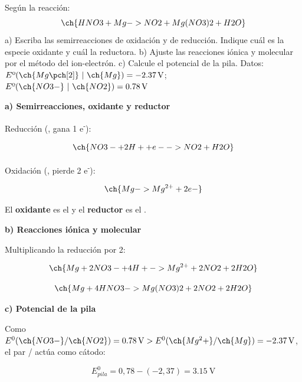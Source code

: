 \begin{exerciseEVAU}
    Según la reacción:
    \begin{equation*}
        \ch{HNO3 + Mg -> NO2 + Mg (NO3)2 + H2O}
    \end{equation*}
    a) Escriba las semirreacciones de oxidación y de reducción. Indique cuál es la especie oxidante y cuál la reductora. b) Ajuste las reacciones iónica y molecular por el método del ion-electrón. c) Calcule el potencial de la pila. Datos: \( E\text{º}(\ch{Mg\pch[2]}\ | \ \ch{Mg}) = \SI{-2.37}{\volt} \); \( E\text{º}(\ch{NO3-}\ | \ \ch{NO2}) = \SI{+0.78}{\volt} \)

    \begin{solu}


        \textbf{a) Semirreacciones, oxidante y reductor}

        Reducción (, gana 1 e\textsuperscript{-}):

        \begin{equation*}
            \ch{NO3- + 2 H+ + e- -> NO2 + H2O}
        \end{equation*}

        Oxidación (, pierde 2 e\textsuperscript{-}):

        \begin{equation*}
            \ch{Mg -> Mg^{2+} + 2 e-}
        \end{equation*}

        El \textbf{oxidante} es el  y el \textbf{reductor} es el .

        \textbf{b) Reacciones iónica y molecular}

        Multiplicando la reducción por 2:

        \begin{equation*}
            \ch{Mg + 2 NO3- + 4 H+ -> Mg^{2+} + 2 NO2 + 2 H2O}
        \end{equation*}

        \begin{equation*}
            \ch{Mg + 4 HNO3 -> Mg(NO3)2 + 2 NO2 + 2 H2O}
        \end{equation*}

        \textbf{c) Potencial de la pila}

        Como \(E^0(\ch{NO3-}/\ch{NO2}) = \SI{0.78}{\volt} > E^0(\ch{Mg^2+}/\ch{Mg}) = \SI{-2.37}{\volt}\), el par / actúa como cátodo:

        \begin{equation*}
            E^0_{pila} = 0,78-(-2,37) = \SI{3.15}{\volt}
        \end{equation*}

    \end{solu}
\end{exerciseEVAU}

